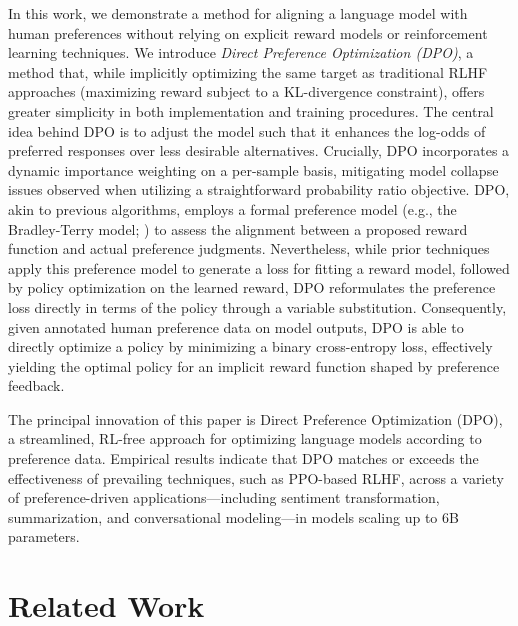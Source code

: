 In this work, we demonstrate a method for aligning a language model with human preferences without relying on explicit reward models or reinforcement learning techniques. We introduce \textit{{Direct Preference Optimization} (DPO)}, a method that, while implicitly optimizing the same target as traditional RLHF approaches (maximizing reward subject to a KL-divergence constraint), offers greater simplicity in both implementation and training procedures. The central idea behind DPO is to adjust the model such that it enhances the log-odds of preferred responses over less desirable alternatives. Crucially, DPO incorporates a dynamic importance weighting on a per-sample basis, mitigating model collapse issues observed when utilizing a straightforward probability ratio objective. DPO, akin to previous algorithms, employs a formal preference model (e.g., the Bradley-Terry model; \cite{bradley1952rankanalysis}) to assess the alignment between a proposed reward function and actual preference judgments. Nevertheless, while prior techniques apply this preference model to generate a loss for fitting a reward model, followed by policy optimization on the learned reward, DPO reformulates the preference loss directly in terms of the policy through a variable substitution. Consequently, given annotated human preference data on model outputs, DPO is able to directly optimize a policy by minimizing a binary cross-entropy loss, effectively yielding the optimal policy for an implicit reward function shaped by preference feedback.

The principal innovation of this paper is Direct Preference Optimization (DPO), a streamlined, RL-free approach for optimizing language models according to preference data. Empirical results indicate that DPO matches or exceeds the effectiveness of prevailing techniques, such as PPO-based RLHF, across a variety of preference-driven applications—including sentiment transformation, summarization, and conversational modeling—in models scaling up to 6B parameters.

\section{Related Work}

